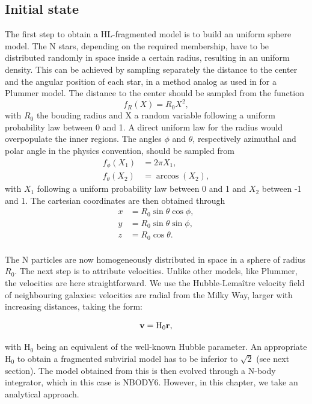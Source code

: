 \subsection{Initial state}

The first step to obtain a HL-fragmented model is to build an uniform sphere model. The N stars, depending on the required membership, have to be distributed randomly in space inside a certain radius, resulting in an uniform density. This can be achieved by sampling separately the distance to the center and the angular position of each star, in a method analog as used in \cite{Aarseth1974} for a Plummer model. The distance to the center should be sampled from the function
\begin{equation}
f_R(X) = R_0 X^2,
\end{equation} 
with $R_0$ the bouding radius and X a random variable following a uniform probability law between 0 and 1. A direct uniform law for the radius would overpopulate the inner regions. The angles $\phi$ and $\theta$, respectively azimuthal and polar angle in the physics convention, should be sampled from
\begin{align}
f_\phi(X_1) & = 2\pi X_1,\\
f_\theta(X_2) &= \arccos{ (X_2) },
\end{align}
with $X_1$ following a uniform probability law between 0 and 1 and $X_2$ between -1 and 1. The cartesian coordinates are then obtained through
\begin{align}
x &= R_0 \sin{\theta} \cos{\phi},\\
y &= R_0 \sin{\theta} \sin{\phi},\\
z &= R_0 \cos{\theta}. \\
\end{align}

The N particles are now homogeneously distributed in space in a sphere of radius $R_0$. The next step is to attribute velocities. Unlike other models, like Plummer, the velocities are here straightforward. We use the Hubble-Lema\^itre velocity field of neighbouring galaxies: velocities are radial from the Milky Way, larger with increasing distances, taking the form:

\begin{equation}
\label{Eq:1_Hubble}
\bold{v} =  \textrm{H}_0 \bold{r},
\end{equation}

with H$_0$ being an equivalent of the well-known Hubble parameter. An appropriate H$_0$ to obtain a fragmented subvirial model has to be inferior to $\sqrt{2}$ (see next section). The model obtained from this is then evolved through a N-body integrator, which in this case is NBODY6. However, in this chapter, we take an analytical approach.


